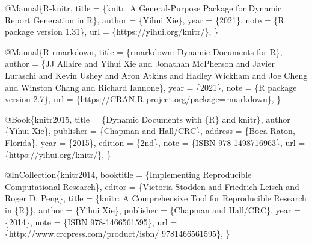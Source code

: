 \documentclass[
  11pt,
]{bxjsreport}
\newenvironment{Shaded}{\begin{snugshade}}{\end{snugshade}}
\newcommand{\DataTypeTok}[1]{\textcolor[rgb]{0.13,0.29,0.53}{#1}}
\newcommand{\NormalTok}[1]{#1}
\newcommand{\OtherTok}[1]{\textcolor[rgb]{0.56,0.35,0.01}{#1}}
\newcommand{\VariableTok}[1]{\textcolor[rgb]{0.00,0.00,0.00}{#1}}
\begin{document}
\begin{Shaded}
\begin{Highlighting}[]
\VariableTok{@Manual}\NormalTok{\{}\OtherTok{R}\NormalTok{{-}}\OtherTok{knitr}\NormalTok{,}
  \DataTypeTok{title}\NormalTok{ = \{knitr: A General{-}Purpose Package for Dynamic}
\NormalTok{    Report Generation in R\},}
  \DataTypeTok{author}\NormalTok{ = \{Yihui Xie\},}
  \DataTypeTok{year}\NormalTok{ = \{2021\},}
  \DataTypeTok{note}\NormalTok{ = \{R package version 1.31\},}
  \DataTypeTok{url}\NormalTok{ = \{https://yihui.org/knitr/\},}
\NormalTok{\}}

\VariableTok{@Manual}\NormalTok{\{}\OtherTok{R}\NormalTok{{-}}\OtherTok{rmarkdown}\NormalTok{,}
  \DataTypeTok{title}\NormalTok{ = \{rmarkdown: Dynamic Documents for R\},}
  \DataTypeTok{author}\NormalTok{ = \{JJ Allaire and Yihui Xie and Jonathan McPherson}
\NormalTok{    and Javier Luraschi and Kevin Ushey and Aron Atkins}
\NormalTok{    and Hadley Wickham and Joe Cheng and Winston Chang and}
\NormalTok{    Richard Iannone\},}
  \DataTypeTok{year}\NormalTok{ = \{2021\},}
  \DataTypeTok{note}\NormalTok{ = \{R package version 2.7\},}
  \DataTypeTok{url}\NormalTok{ = \{https://CRAN.R{-}project.org/package=rmarkdown\},}
\NormalTok{\}}

\VariableTok{@Book}\NormalTok{\{}\OtherTok{knitr2015}\NormalTok{,}
  \DataTypeTok{title}\NormalTok{ = \{Dynamic Documents with \{R\} and knitr\},}
  \DataTypeTok{author}\NormalTok{ = \{Yihui Xie\},}
  \DataTypeTok{publisher}\NormalTok{ = \{Chapman and Hall/CRC\},}
  \DataTypeTok{address}\NormalTok{ = \{Boca Raton, Florida\},}
  \DataTypeTok{year}\NormalTok{ = \{2015\},}
  \DataTypeTok{edition}\NormalTok{ = \{2nd\},}
  \DataTypeTok{note}\NormalTok{ = \{ISBN 978{-}1498716963\},}
  \DataTypeTok{url}\NormalTok{ = \{https://yihui.org/knitr/\},}
\NormalTok{\}}

\VariableTok{@InCollection}\NormalTok{\{}\OtherTok{knitr2014}\NormalTok{,}
  \DataTypeTok{booktitle}\NormalTok{ = \{Implementing Reproducible Computational}
\NormalTok{    Research\},}
  \DataTypeTok{editor}\NormalTok{ = \{Victoria Stodden and Friedrich Leisch and Roger}
\NormalTok{    D. Peng\},}
  \DataTypeTok{title}\NormalTok{ = \{knitr: A Comprehensive Tool for Reproducible}
\NormalTok{    Research in \{R\}\},}
  \DataTypeTok{author}\NormalTok{ = \{Yihui Xie\},}
  \DataTypeTok{publisher}\NormalTok{ = \{Chapman and Hall/CRC\},}
  \DataTypeTok{year}\NormalTok{ = \{2014\},}
  \DataTypeTok{note}\NormalTok{ = \{ISBN 978{-}1466561595\},}
  \DataTypeTok{url}\NormalTok{ = \{http://www.crcpress.com/product/isbn/}
\NormalTok{    9781466561595\},}
\NormalTok{\}}


\end{Highlighting}
\end{Shaded}
\end{document}

